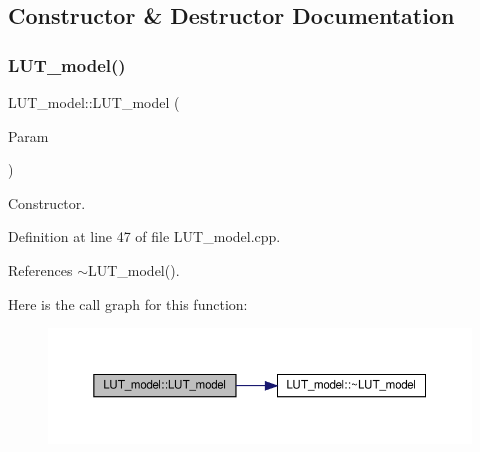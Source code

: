 \subsection{Constructor \& Destructor Documentation}
\mbox{\label{classLUT__model_a1ba8b7a2d18eefa7e12cd2be92d212b2}} 
\subsubsection{\texorpdfstring{L\+U\+T\+\_\+model()}{LUT\_model()}}
{\footnotesize\ttfamily L\+U\+T\+\_\+model\+::\+L\+U\+T\+\_\+model (\begin{DoxyParamCaption}\item[{const \hyperlink{Parameter_8hpp_a37841774a6fcb479b597fdf8955eb4ea}{Parameter\+Const\+Ref}}]{Param }\end{DoxyParamCaption})\hspace{0.3cm}{\ttfamily [explicit]}}



Constructor. 



Definition at line 47 of file L\+U\+T\+\_\+model.\+cpp.



References $\sim$\+L\+U\+T\+\_\+model().

Here is the call graph for this function\+:
\nopagebreak
\begin{figure}[H]
\begin{center}
\leavevmode
\includegraphics[width=350pt]{dd/da2/classLUT__model_a1ba8b7a2d18eefa7e12cd2be92d212b2_cgraph}
\end{center}
\end{figure}
\mbox{\label{classLUT__model_a2c3cebbb4524c36b95d954cc2f774eaf}} 

